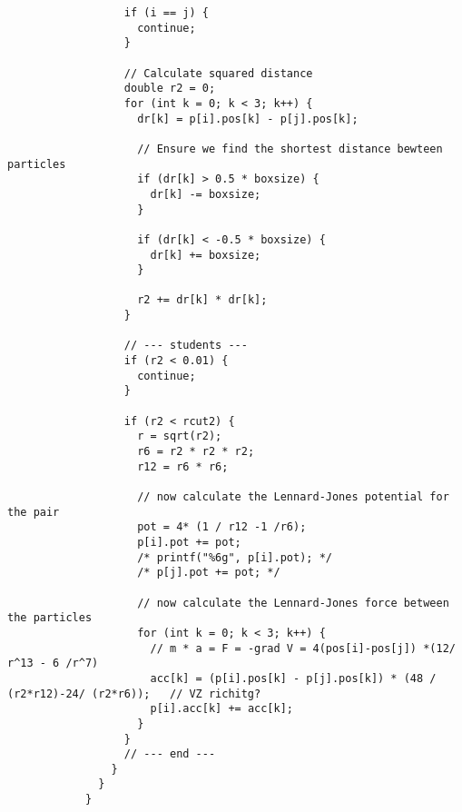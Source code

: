 \begin{lstlisting}
                  if (i == j) {
                    continue;
                  }
            
                  // Calculate squared distance
                  double r2 = 0;
                  for (int k = 0; k < 3; k++) {
                    dr[k] = p[i].pos[k] - p[j].pos[k];
            
                    // Ensure we find the shortest distance bewteen particles
                    if (dr[k] > 0.5 * boxsize) {
                      dr[k] -= boxsize;
                    }
            
                    if (dr[k] < -0.5 * boxsize) {
                      dr[k] += boxsize;
                    }
            
                    r2 += dr[k] * dr[k];
                  }
            
                  // --- students ---
                  if (r2 < 0.01) {
                    continue;
                  }
            
                  if (r2 < rcut2) {
                    r = sqrt(r2);
                    r6 = r2 * r2 * r2;
                    r12 = r6 * r6;
            
                    // now calculate the Lennard-Jones potential for the pair
                    pot = 4* (1 / r12 -1 /r6);
                    p[i].pot += pot;
                    /* printf("%6g", p[i].pot); */
                    /* p[j].pot += pot; */
            
                    // now calculate the Lennard-Jones force between the particles
                    for (int k = 0; k < 3; k++) {
                      // m * a = F = -grad V = 4(pos[i]-pos[j]) *(12/ r^13 - 6 /r^7)
                      acc[k] = (p[i].pos[k] - p[j].pos[k]) * (48 / (r2*r12)-24/ (r2*r6));   // VZ richitg?
                      p[i].acc[k] += acc[k];
                    }
                  }
                  // --- end ---
                }
              }
            }\end{lstlisting}

